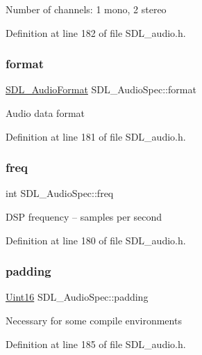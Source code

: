 Number of channels\+: 1 mono, 2 stereo 

Definition at line 182 of file S\+D\+L\+\_\+audio.\+h.

\mbox{\label{struct_s_d_l___audio_spec_ae37c634cac5807762f184c8d5d49fc2d}} 
\subsubsection{\texorpdfstring{format}{format}}
{\footnotesize\ttfamily \mbox{\hyperlink{_s_d_l__audio_8h_a491ed103fd25d920c4e6b7495217ce66}{S\+D\+L\+\_\+\+Audio\+Format}} S\+D\+L\+\_\+\+Audio\+Spec\+::format}

Audio data format 

Definition at line 181 of file S\+D\+L\+\_\+audio.\+h.

\mbox{\label{struct_s_d_l___audio_spec_a8b823ce46fc2e448cf7e6fc141aff6b2}} 
\subsubsection{\texorpdfstring{freq}{freq}}
{\footnotesize\ttfamily int S\+D\+L\+\_\+\+Audio\+Spec\+::freq}

D\+SP frequency -- samples per second 

Definition at line 180 of file S\+D\+L\+\_\+audio.\+h.

\mbox{\label{struct_s_d_l___audio_spec_a738371fc13b54cefef4db16994abeeb6}} 
\subsubsection{\texorpdfstring{padding}{padding}}
{\footnotesize\ttfamily \mbox{\hyperlink{_s_d_l__stdinc_8h_a31fcc0a076c9068668173ee26d33e42b}{Uint16}} S\+D\+L\+\_\+\+Audio\+Spec\+::padding}

Necessary for some compile environments 

Definition at line 185 of file S\+D\+L\+\_\+audio.\+h.

\mbox{\label{struct_s_d_l___audio_spec_a2cdf5e885808c10bfa2810b706e69f95}} 
